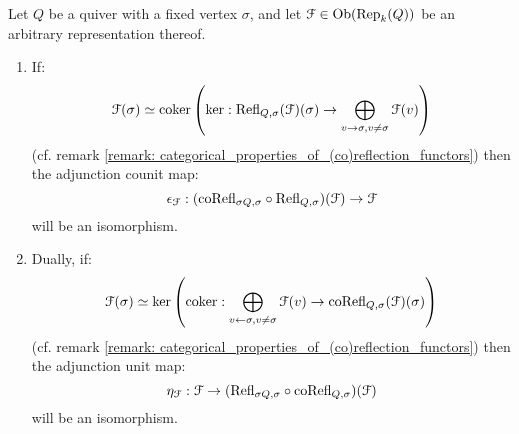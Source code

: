             \begin{lemma} \label{lemma: fixed_points_of_(co)reflection_adjunctions}
                Let $Q$ be a quiver with a fixed vertex $\sigma$, and let $\mathcal{F} \in \mathrm{Ob}(\mathrm{Rep}_k(Q))$ be an arbitrary representation thereof.
                    \begin{enumerate}
                        \item If:
                            $$\mathcal{F}(\sigma) \simeq \operatorname{coker} \left( \ker: \mathrm{Refl}_{Q, \sigma}(\mathcal{F})(\sigma) \to \bigoplus_{v \to \sigma, v \not = \sigma} \mathcal{F}(v) \right)$$
                        (cf. remark \ref{remark: categorical_properties_of_(co)reflection_functors}) then the adjunction counit map:
                            $$\epsilon_{\mathcal{F}}: (\mathrm{co}\mathrm{Refl}_{\sigma Q, \sigma} \circ \mathrm{Refl}_{Q, \sigma})(\mathcal{F}) \to \mathcal{F}$$
                        will be an isomorphism.
                        \item Dually, if:
                            $$\mathcal{F}(\sigma) \simeq \ker \left( \operatorname{coker}: \bigoplus_{v \leftarrow \sigma, v \not = \sigma} \mathcal{F}(v) \to \mathrm{co}\mathrm{Refl}_{Q, \sigma}(\mathcal{F})(\sigma) \right)$$
                        (cf. remark \ref{remark: categorical_properties_of_(co)reflection_functors}) then the adjunction unit map:
                            $$\eta_{\mathcal{F}}: \mathcal{F} \to (\mathrm{Refl}_{\sigma Q, \sigma} \circ \mathrm{co}\mathrm{Refl}_{Q, \sigma})(\mathcal{F})$$
                        will be an isomorphism.
                    \end{enumerate}
            \end{lemma}
